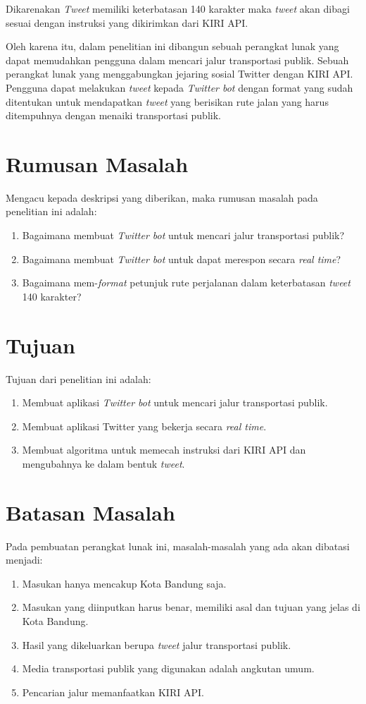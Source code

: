 Dikarenakan \textit{Tweet} memiliki keterbatasan 140 karakter maka \textit{tweet} akan dibagi sesuai dengan instruksi yang dikirimkan dari KIRI API.

Oleh karena itu, dalam penelitian ini dibangun sebuah perangkat lunak yang dapat memudahkan pengguna dalam mencari jalur transportasi publik. Sebuah perangkat lunak yang menggabungkan jejaring sosial Twitter dengan KIRI API. Pengguna dapat melakukan \textit{tweet} kepada \textit{Twitter bot} dengan format yang sudah ditentukan untuk mendapatkan \textit{tweet} yang berisikan rute jalan yang harus ditempuhnya dengan menaiki transportasi publik.

\section{Rumusan Masalah}
Mengacu kepada deskripsi yang diberikan, maka rumusan masalah pada penelitian ini adalah:
\begin{enumerate}
	\item Bagaimana membuat \textit{Twitter bot} untuk mencari jalur transportasi publik?
	\item Bagaimana membuat \textit{Twitter bot} untuk dapat merespon secara \textit{real time}?
	\item Bagaimana mem-\textit{format} petunjuk rute perjalanan dalam keterbatasan \textit{tweet} 140 karakter?
\end{enumerate}

\section{Tujuan}
Tujuan dari penelitian ini adalah:
\begin{enumerate}
	\item Membuat aplikasi \textit{Twitter bot} untuk mencari jalur transportasi publik.
	\item Membuat aplikasi Twitter yang bekerja secara \textit{real time}.
	\item Membuat algoritma untuk memecah instruksi dari KIRI API dan mengubahnya ke dalam bentuk \textit{tweet}.
\end{enumerate}

\section{Batasan Masalah}
Pada pembuatan perangkat lunak ini, masalah-masalah yang ada akan dibatasi menjadi:
\begin{enumerate}
	\item Masukan hanya mencakup Kota Bandung saja.
	\item Masukan yang diinputkan harus benar, memiliki asal dan tujuan yang jelas di Kota Bandung.
	\item Hasil yang dikeluarkan berupa \textit{tweet} jalur transportasi publik.
	\item Media transportasi publik yang digunakan adalah angkutan umum.
	\item Pencarian jalur memanfaatkan KIRI API.
\end{enumerate}


